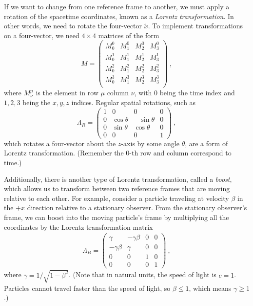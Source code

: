 If we want to change from one reference frame to another, we must apply a rotation of the spacetime coordinates, known as a {\it Lorentz transformation}. In other words, we need to rotate the four-vector $\tilde{x}$. To implement transformations on a four-vector, we need $4\times 4$ matrices of the form
\begin{equation}
    M = \begin{pmatrix}
        M^0_0 & M^0_1 & M^0_2 & M^0_3 \\
        M^1_0 & M^1_1 & M^1_2 & M^1_3 \\
        M^2_0 & M^2_1 & M^2_2 & M^2_3 \\
        M^3_0 & M^3_1 & M^3_2 & M^3_3 \\
    \end{pmatrix} \ ,
\end{equation}
where $M^\mu_\nu$ is the element in row $\mu$ column $\nu$, with $0$ being the time index and $1,2,3$ being the $x,y,z$ indices. Regular spatial rotations, such as
\begin{equation}
    \Lambda_R = \begin{pmatrix}
        1 & 0 & 0 & 0 \\
        0 & \cos{\theta} & -\sin{\theta} & 0 \\
        0 & \sin{\theta} & \cos{\theta} & 0 \\
        0 & 0 & 0 & 1
    \end{pmatrix} \ ,
\end{equation}
which rotates a four-vector about the $z$-axis by some angle $\theta$, are a form of Lorentz transformation. (Remember the $0$-th row and column correspond to time.) 

Additionally, there is another type of Lorentz transformation, called a {\it boost}, which allows us to transform between two reference frames that are moving relative to each other. For example, consider a particle traveling at velocity $\beta$ in the $+x$ direction relative to a stationary observer. From the stationary observer's frame, we can boost into the moving particle's frame by multiplying all the coordinates by the Lorentz transformation matrix
\begin{align}
    \Lambda_B = \begin{pmatrix}
        \gamma & -\gamma\beta & 0 & 0 \\
        -\gamma\beta & \gamma & 0 & 0 \\
        0 & 0 & 1 & 0 \\
        0 & 0 & 0 & 1 
    \end{pmatrix} \ , \label{eqn.boost}
\end{align}
where $\gamma = 1/\sqrt{1-\beta^2}$. (Note that in natural units, the speed of light is $c=1$. Particles cannot travel faster than the speed of light, so $\beta \leq 1$, which means $\gamma \ge 1$.) 

